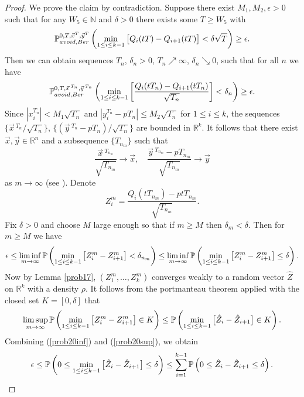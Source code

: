 \begin{proof}
	We prove the claim by contradiction. Suppose there exist $M_1,M_2,\epsilon>0$ such that for any $W_5\in \mathbb{N}$ and $\delta>0$ there exists some $T\geq W_5$ with
	\[
	\mathbb{P}^{0,T,\vec x^T,\vec y^T}_{avoid, Ber}\left(\min_{1\leq i\leq k-1}\big[Q_i(tT)-Q_{i+1}(tT)\big]<\delta\sqrt{T}\right)\geq \epsilon.
	\]
	Then we can obtain sequences $T_n$, $\delta_n>0$, $T_n \nearrow \infty$, $\delta_n \searrow 0$, such that for all $n$ we have  
	\[
	\mathbb{P}^{0,T,\vec x\,^{T_n},\vec y\,^{T_n}}_{avoid, Ber}\left(\min_{1\leq i\leq k-1}\left[\frac{Q_i(tT_n)-Q_{i+1}(tT_n)}{\sqrt{T_n}}\right]<\delta_n\right)\geq \epsilon.
	\]
	Since $|x_i^{T_n}|<M_1\sqrt{T_n}$ and $|y_i^{T_n}-pT_n|\leq M_2\sqrt{T_n}$ for $1\leq i\leq k$, the sequences $\{\vec{x}\,^{T_n}/\sqrt{T_n}\}$, $\{(\vec{y}\,^{T_n}-pT_n)/\sqrt{T_n}\}$ are bounded in $\mathbb{R}^k$. It follows that there exist $\vec{x},\vec{y}\in\mathbb{R}^n$ and a subsequence $\{T_{n_m}\}$ such that 
	\[
	\frac{\vec{x}\,^{T_{n_m}}}{\sqrt{T_{n_m}}} \longrightarrow \vec x, \quad
	\frac{\vec{y}\,^{T_{n_m}}-pT_{n_m}}{\sqrt{T_{n_m}}} \longrightarrow \vec y
	\] 
	as $m\to\infty$ (see \cite[Theorem 3.6]{Rudin}). Denote $$Z_i^m =\frac{Q_i(tT_{n_m})-ptT_{n_m}}{\sqrt{T_{n_m}}}.$$ Fix $\delta > 0$ and choose $M$ large enough so that if $m\geq M$ then $\delta_m < \delta$. Then for $m\geq M$ we have
	\begin{equation}\label{prob20inf}
	\epsilon\leq \liminf_{m\to\infty}\mathbb{P}\left(\min_{1\leq i\leq k-1} \big[Z_i^m-Z_{i+1}^m\big] < \delta_{n_m}\right) \leq \liminf_{m\to\infty}\mathbb{P}\left(\min_{1\leq i\leq k-1} \big[ Z_i^m-Z_{i+1}^m\big] \leq\delta\right).
	\end{equation}
	Now by Lemma \ref{prob17}, $(Z_1^m,\dots, Z_k^m)$ converges weakly to a random vector $\hat Z$ on $\mathbb{R}^k$ with a density $\rho$. It follows from the portmanteau theorem \cite[Theorem 3.2.11]{Durrett} applied with the closed set $K=[0,\delta]$ that
	\begin{equation}\label{prob20sup}
	\limsup_{m\to\infty }\mathbb{P}\left(\min_{1\leq i\leq k-1} \big[Z_i^m-Z_{i+1}^m\big]\in K\right)\leq \mathbb{P}\left(\min_{1\leq i\leq k-1} \big[\hat Z_i-\hat Z_{i+1}\big]\in K\right).
	\end{equation}
	Combining (\ref{prob20inf}) and (\ref{prob20sup}), we obtain
	\begin{equation}\label{eq:ineq}
	\epsilon\leq \pr\left(0 \leq \min_{1\leq i\leq k-1} \big[\hat Z_i-\hat Z_{i+1}\big]\leq\delta\right)\leq \sum_{i=1}^{k-1}\pr\left(0 \leq \hat Z_i-\hat Z_{i+1}\leq \delta\right).

\end{equation}
\end{proof}

